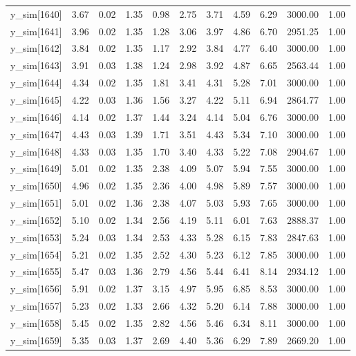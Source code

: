 \begin{table}[ht]
\begin{tabular}{rrrrrrrrrrr}
  y\_sim[1640] & 3.67 & 0.02 & 1.35 & 0.98 & 2.75 & 3.71 & 4.59 & 6.29 & 3000.00 & 1.00 \\ 
  y\_sim[1641] & 3.96 & 0.02 & 1.35 & 1.28 & 3.06 & 3.97 & 4.86 & 6.70 & 2951.25 & 1.00 \\ 
  y\_sim[1642] & 3.84 & 0.02 & 1.35 & 1.17 & 2.92 & 3.84 & 4.77 & 6.40 & 3000.00 & 1.00 \\ 
  y\_sim[1643] & 3.91 & 0.03 & 1.38 & 1.24 & 2.98 & 3.92 & 4.87 & 6.65 & 2563.44 & 1.00 \\ 
  y\_sim[1644] & 4.34 & 0.02 & 1.35 & 1.81 & 3.41 & 4.31 & 5.28 & 7.01 & 3000.00 & 1.00 \\ 
  y\_sim[1645] & 4.22 & 0.03 & 1.36 & 1.56 & 3.27 & 4.22 & 5.11 & 6.94 & 2864.77 & 1.00 \\ 
  y\_sim[1646] & 4.14 & 0.02 & 1.37 & 1.44 & 3.24 & 4.14 & 5.04 & 6.76 & 3000.00 & 1.00 \\ 
  y\_sim[1647] & 4.43 & 0.03 & 1.39 & 1.71 & 3.51 & 4.43 & 5.34 & 7.10 & 3000.00 & 1.00 \\ 
  y\_sim[1648] & 4.33 & 0.03 & 1.35 & 1.70 & 3.40 & 4.33 & 5.22 & 7.08 & 2904.67 & 1.00 \\ 
  y\_sim[1649] & 5.01 & 0.02 & 1.35 & 2.38 & 4.09 & 5.07 & 5.94 & 7.55 & 3000.00 & 1.00 \\ 
  y\_sim[1650] & 4.96 & 0.02 & 1.35 & 2.36 & 4.00 & 4.98 & 5.89 & 7.57 & 3000.00 & 1.00 \\ 
  y\_sim[1651] & 5.01 & 0.02 & 1.36 & 2.38 & 4.07 & 5.03 & 5.93 & 7.65 & 3000.00 & 1.00 \\ 
  y\_sim[1652] & 5.10 & 0.02 & 1.34 & 2.56 & 4.19 & 5.11 & 6.01 & 7.63 & 2888.37 & 1.00 \\ 
  y\_sim[1653] & 5.24 & 0.03 & 1.34 & 2.53 & 4.33 & 5.28 & 6.15 & 7.83 & 2847.63 & 1.00 \\ 
  y\_sim[1654] & 5.21 & 0.02 & 1.35 & 2.52 & 4.30 & 5.23 & 6.12 & 7.85 & 3000.00 & 1.00 \\ 
  y\_sim[1655] & 5.47 & 0.03 & 1.36 & 2.79 & 4.56 & 5.44 & 6.41 & 8.14 & 2934.12 & 1.00 \\ 
  y\_sim[1656] & 5.91 & 0.02 & 1.37 & 3.15 & 4.97 & 5.95 & 6.85 & 8.53 & 3000.00 & 1.00 \\ 
  y\_sim[1657] & 5.23 & 0.02 & 1.33 & 2.66 & 4.32 & 5.20 & 6.14 & 7.88 & 3000.00 & 1.00 \\ 
  y\_sim[1658] & 5.45 & 0.02 & 1.35 & 2.82 & 4.56 & 5.46 & 6.34 & 8.11 & 3000.00 & 1.00 \\ 
  y\_sim[1659] & 5.35 & 0.03 & 1.37 & 2.69 & 4.40 & 5.36 & 6.29 & 7.89 & 2669.20 & 1.00 \\ 

\end{tabular}
\end{table}
